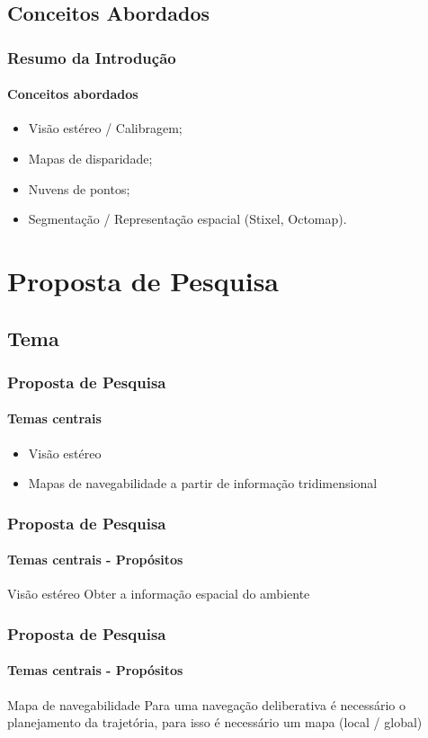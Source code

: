 \documentclass[brazil]{beamer}
\begin{document}
\subsection[Conceitos]{Conceitos Abordados}

\begin{frame}
\frametitle{Resumo da Introdução}
\framesubtitle{Conceitos abordados}
\begin{itemize}
\item Visão estéreo / Calibragem;
\item Mapas de disparidade;
\item Nuvens de pontos;
\item Segmentação / Representação espacial (Stixel, Octomap).
\end{itemize}
\end{frame}


\section{Proposta de Pesquisa}

\subsection[Tema]{Tema}


\begin{frame}
\frametitle{Proposta de Pesquisa}
\framesubtitle{Temas centrais}
\begin{itemize}
\item Visão estéreo
\item Mapas de navegabilidade a partir de informação tridimensional
\end{itemize}
\end{frame}


\begin{frame}
\frametitle{Proposta de Pesquisa}
\framesubtitle{Temas centrais - Propósitos}
\begin{block}{Visão estéreo}
Obter a informação espacial do ambiente
\end{block}
\end{frame}


\begin{frame}
\frametitle{Proposta de Pesquisa}
\framesubtitle{Temas centrais - Propósitos}
\begin{block}{Mapa de navegabilidade}
Para uma navegação deliberativa é necessário o planejamento da trajetória, para isso é necessário 
um mapa (local / global)
\end{block}
\end{frame}
\end{document}

